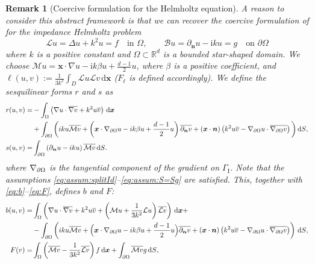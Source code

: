 \documentclass[a4paper]{article}
\theoremstyle{plain}
\newtheorem{remark}[theorem]{Remark}
\theoremstyle{definition}
\newcommand{\conj}[1]{\overline{#1}}
\newcommand{\operator}[1]{\mathcal{#1}}
\newcommand{\dx}{{\,\mathrm{d}\vect x}}
\newcommand{\dS}{{\,\mathrm{d}S}}
\newcommand{\Grad}[1]{\nabla #1}
\newcommand{\Lap}[1]{\Delta #1}
\newcommand{\Gradbound}[1]{\Grad _{\partial \Omega} {#1}}
\newcommand{\NormDer}{{\partial_{\bm{n}}}}
\newcommand{\vect}[1]{\bm{#1}}
\newcommand{\normal}{\bm{n}}
\newcommand{\R}{\mathbb{R}}
\newcommand{\Ll}{{F_{\ell}}}
\newcommand{\GI}{{\Gamma_{\mathrm I}}}
\newcommand{\oL}{{\operator{L}}}
\begin{document}
\begin{remark}[Coercive formulation for the Helmholtz equation]\label{rem:Helmholtz} \;
	A reason to consider this abstract framework is that we can recover the coercive formulation of \cite{Moiola2014} for the impedance Helmholtz problem
	$$
		\operator{L}u = \Lap u + k^2 u = f \quad \text{in }\Omega, \qquad
		\operator{B}u = \NormDer{u} -\textrm{i} k u = g \quad \text{on }\partial \Omega
	$$
	where $k$ is a positive constant and $\Omega \subset \R^d$ is a bounded star-shaped domain.
	We choose
	$\operator{M}u = \vect{x} \cdot \Grad u - \textrm{i} k\beta u + \frac{d - 1}{2}u$, where $\beta$ is a positive coefficient, and $\ell(u,v) := \frac1{3k^2}
	\int_D \oL u \oL v \dx$ ($\Ll$ is defined accordingly).
	We define the sesquilinear forms $r$ and $s$ as
\begin{align*}
		r(u,v) = & - \int_{\Omega} \left(\Grad u \cdot \conj{\Grad v} + k^2 u \conj{v}\right) \dx                     \\
		         & + \int_{\partial \Omega}\bigg( \textrm{i} k
		u \conj{\operator{M}v} + \left(\vect{x} \cdot \Grad_{\partial \Omega} u - \textrm{i}k\beta u + \frac{d-1}2 u\right) \conj{\NormDer{v}}
+(\vect{x} \cdot \normal) \left(k^2 u \conj{v} - \Grad_{\partial \Omega} u \cdot \conj{\Grad_{\partial \Omega} v}\right)\bigg)\dS,
		\\
		s(u,v) = & \int_{\partial \Omega} \left(\NormDer{u} - \textrm{i}  k u \right) \conj{\operator{M}v} \dS.
	\end{align*}
	where $\Grad_{\partial \Omega}$ is the tangential component of the gradient on $\GI$.
	Note that the assumptions \eqref{eq:assum:splitId}--\eqref{eq:assum:S=Sg} are satisfied.
	This, together with \eqref{eq:b}--\eqref{eq:F}, defines $b$ and $F$:
	\begin{align*}
		b(u,v) = & \int_{\Omega} \left(\Grad u \cdot \conj{\Grad v} + k^2 u \conj{v} + \left(\operator{M}u + \frac{1}{3k^2} \operator{L}u\right) \conj{\operator{L}v}\right) \dx + \\
		         & -  \int_{\partial \Omega} \left(\textrm{i} ku \conj{\operator{M}v} + \Big(\vect{x} \cdot \Gradbound{u} - \textrm{i}                                       k \beta u + \frac{d-1}{2}u\Big) \conj{\NormDer{v}} + (\vect{x} \cdot \normal) \left(k^2 u\conj{v} - \Gradbound{u} \cdot \conj{\Gradbound{v}}\right) \right)\dS,
		\\
		F(v) =   & \int_{\Omega}\left(\conj{\operator{M}v} - \frac{1}{3k^2}\conj{\operator{L}v}\right) f \dx + \int_{\partial \Omega} \conj{\operator{M}v}g \dS,
	\end{align*}

\end{remark}
\end{document}
